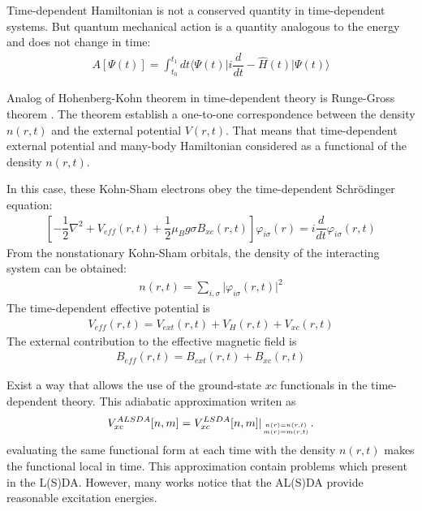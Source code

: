 Time-dependent Hamiltonian is not a conserved quantity in time-dependent systems. But quantum mechanical action is a quantity analogous to the energy and does not change in time:
\begin{align}
A \left[ \Psi (t) \right]= \int_{t_0}^{t_1} dt \langle \Psi (t) \vert i \dfrac{d}{dt}-\hat{H}(t) \vert \Psi (t) \rangle 
\label{DFT_Action}
\end{align}

Analog of Hohenberg-Kohn theorem in time-dependent theory is Runge-Gross theorem \citep{PhysRevLett.52.997}.
The theorem establish a one-to-one correspondence between the density $n(r,t)$ and the external potential $V(r,t)$.
That means that time-dependent external potential and many-body Hamiltonian considered as a functional of the density $n(r,t)$.

In this case, these Kohn-Sham electrons obey the time-dependent Schrödinger equation:
\begin{align}
\left[ -\dfrac{1}{2} \nabla^2 + V_{eff}(r,t) + \dfrac{1}{2} \mu_B g \sigma B_{xc}(r,t) \right] \varphi_{i\sigma }(r)= i \dfrac{d}{dt} \varphi_{i\sigma }(r,t)
\label{DFT_KS_td}
\end{align}
From the nonstationary Kohn-Sham orbitals, the density of the interacting system can be obtained:
\begin{align}
n(r,t)=\sum_{i,\sigma}\vert \varphi_{i \sigma}(r,t) \vert^2
\label{DFT_density_td}
\end{align}
The time-dependent effective potential is 
\begin{align}
V_{eff}(r,t)=V_{ext}(r,t)+V_H(r,t)+V_{xc}(r,t)
\label{DFT_V_eff_td}
\end{align}
The external contribution to the effective magnetic field is
\begin{align}
B_{eff}(r,t)=B_{ext}(r,t)+B_{xc}(r,t)
\label{DFT_B_eff_td}
\end{align}

Exist a way that allows the use of the ground-state $xc$ functionals in the time-dependent theory. This adiabatic approximation writen as
\begin{align}
V_{xc}^{ALSDA}[n,m]=V_{xc}^{LSDA}[n,m] \vert_{{n(r)=n(r,t) \atop m(r)=m(r,t)}}.
\label{DFT_V_xc_td}
\end{align}
evaluating the same functional form at each time with the density $n(r,t)$ makes the functional local in time. This approximation contain problems which present in the L(S)DA.
However, many works \citep{Niesert:15621,Marques_Gross_TDDFT} notice that the AL(S)DA provide reasonable excitation energies.



